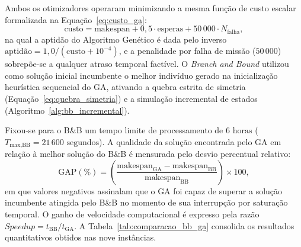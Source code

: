 Ambos os otimizadores operaram minimizando a mesma função de custo escalar formalizada na Equação~\eqref{eq:custo_ga}:
\begin{equation}\label{eq:custo_caso1}
\text{custo} = \text{makespan} + 0{,}5 \cdot \text{esperas} + 50\,000 \cdot N_{\text{falha}},
\end{equation}
na qual a aptidão do Algoritmo Genético é dada pelo inverso $\text{aptidão} = 1{,}0 / (\text{custo} + 10^{-4})$, e a penalidade por falha de missão ($50\,000$) sobrepõe-se a qualquer atraso temporal factível. O \textit{Branch and Bound} utilizou como solução inicial incumbente o melhor indivíduo gerado na inicialização heurística sequencial do GA, ativando a quebra estrita de simetria (Equação~\eqref{eq:quebra_simetria}) e a simulação incremental de estados (Algoritmo~\ref{alg:bb_incremental}).

Fixou-se para o B\&B um tempo limite de processamento de $6\text{ horas}$ ($T_{\text{max,BB}} = 21\,600\text{ segundos}$). A qualidade da solução encontrada pelo GA em relação à melhor solução do B\&B é mensurada pelo desvio percentual relativo:
\begin{equation}\label{eq:gap_bb_ga}
\text{GAP} (\%) = \left( \frac{\text{makespan}_{\text{GA}} - \text{makespan}_{\text{BB}}}{\text{makespan}_{\text{BB}}} \right) \times 100,
\end{equation}
em que valores negativos assinalam que o GA foi capaz de superar a solução incumbente atingida pelo B\&B no momento de sua interrupção por saturação temporal. O ganho de velocidade computacional é expresso pela razão $\textit{Speedup} = t_{\text{BB}} / t_{\text{GA}}$. A Tabela~\ref{tab:comparacao_bb_ga} consolida os resultados quantitativos obtidos nas nove instâncias.

